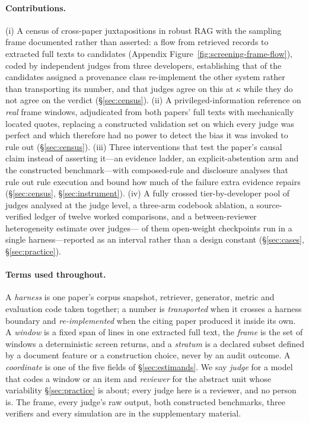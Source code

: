 \documentclass[11pt]{article}
\begin{document}
\paragraph{Contributions.}
(i) A census of cross-paper juxtapositions in robust RAG with the sampling frame
documented rather than asserted: a flow from \FlowRetrieved{} retrieved records
to \FlowTexts{} extracted full texts to \FrameCandidates{} candidates
(Appendix Figure~\ref{fig:screening-frame-flow}), coded by independent judges
from three developers, establishing that \ProvReimplemented{} of the
\ProvClassified{} candidates assigned a provenance class re-implement the other
system rather than transporting its number, and that judges agree on this at
$\kappa$ \DecProvK{} while they do not agree on the verdict
(\S\ref{sec:census}).
(ii) A privileged-information reference on \PrivN{} \emph{real} frame windows,
adjudicated from both papers' full texts with mechanically located quotes,
replacing a constructed validation set on which every judge was perfect and
which therefore had no power to detect the bias it was invoked to rule out
(\S\ref{sec:census}).
(iii) Three interventions that test the paper's causal claim instead of
asserting it---an evidence ladder, an explicit-abstention arm and the
constructed benchmark---with composed-rule and disclosure analyses that rule out
rule execution and bound how much of the failure extra evidence repairs
(\S\ref{sec:census}, \S\ref{sec:instrument}).
(iv) A fully crossed tier-by-developer pool of \TierPanelN{} judges analysed at
the judge level, a three-arm codebook ablation, a source-verified ledger of
twelve worked comparisons, and a between-reviewer heterogeneity estimate over
\OwjNTotal{} judges---\OwjNOpen{} of them open-weight checkpoints run in a
single harness---reported as an interval rather than a design constant
(\S\ref{sec:cases}, \S\ref{sec:practice}).

\paragraph{Terms used throughout.}
A \emph{harness} is one paper's corpus snapshot, retriever, generator, metric
and evaluation code taken together; a number is \emph{transported} when it
crosses a harness boundary and \emph{re-implemented} when the citing paper
produced it inside its own. A \emph{window} is a fixed span of lines in one
extracted full text, the \emph{frame} is the set of windows a deterministic
screen returns, and a \emph{stratum} is a declared subset defined by a document
feature or a construction choice, never by an audit outcome. A
\emph{coordinate} is one of the five fields of \S\ref{sec:estimands}. We say
\emph{judge} for a model that codes a window or an item and \emph{reviewer} for
the abstract unit whose variability \S\ref{sec:practice} is about; every judge
here is a reviewer, and no person is. The frame, every judge's raw output, both
constructed benchmarks, three verifiers and every simulation are in the
supplementary material.
\end{document}

